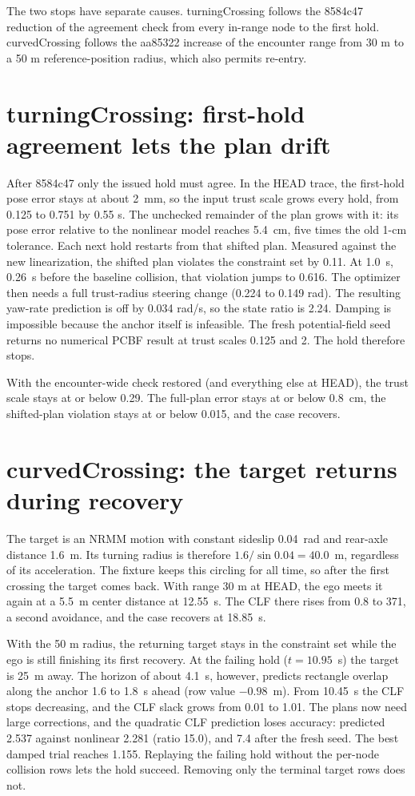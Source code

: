 \documentclass[11pt]{article}
\begin{document}
The two stops have separate causes. turningCrossing follows the 8584c47
reduction of the agreement check from every in-range node to the first
hold. curvedCrossing follows the aa85322 increase of the encounter range from
30 m to a 50 m reference-position radius, which also permits re-entry.

\section{turningCrossing: first-hold agreement lets the plan drift}
After 8584c47 only the issued hold must agree. In the HEAD trace, the
first-hold pose error stays at about 2~mm, so the input trust scale grows
every hold, from 0.125 to 0.751 by 0.55 s. The unchecked remainder of the
plan grows with it: its pose error relative to the nonlinear model reaches
5.4~cm, five times the old 1-cm tolerance. Each next hold restarts from that
shifted plan. Measured against the new linearization, the shifted plan
violates the constraint set by 0.11. At 1.0~s, 0.26~s before the baseline
collision, that violation jumps to 0.616. The optimizer then needs a full
trust-radius steering change (0.224 to 0.149 rad). The resulting yaw-rate
prediction is off by 0.034 rad/s, so the state ratio is 2.24. Damping is
impossible because the anchor itself is infeasible. The fresh
potential-field seed returns no numerical PCBF result at trust scales 0.125
and 2. The hold therefore stops.

With the encounter-wide check restored (and everything else at HEAD), the
trust scale stays at or below 0.29. The full-plan error stays at or below
0.8~cm, the shifted-plan violation stays at or below 0.015, and the case
recovers.

\section{curvedCrossing: the target returns during recovery}
The target is an NRMM motion with constant sideslip 0.04~rad and rear-axle
distance 1.6~m. Its turning radius is therefore
$1.6/\sin 0.04 = 40.0$~m, regardless of its acceleration. The fixture keeps
this circling for all time, so after the first crossing the target comes
back. With range 30 m at HEAD, the ego meets it again at a 5.5~m center
distance at 12.55~s. The CLF there rises from 0.8 to 371, a second avoidance,
and the case recovers at 18.85~s.

With the 50 m radius, the returning target stays in the constraint set while
the ego is still finishing its first recovery. At the failing hold
($t=10.95$~s) the target is 25~m away. The horizon of about 4.1~s, however,
predicts rectangle overlap along the anchor 1.6 to 1.8~s ahead (row value
$-0.98$~m). From 10.45~s the CLF stops decreasing, and the CLF slack grows
from 0.01 to 1.01. The plans now need large corrections, and the quadratic
CLF prediction loses accuracy: predicted 2.537 against nonlinear 2.281
(ratio 15.0), and 7.4 after the fresh seed. The best damped trial reaches
1.155. Replaying the failing hold without the per-node collision rows lets
the hold succeed. Removing only the terminal target rows does not.
\end{document}

